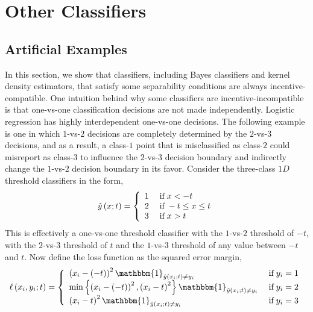 \documentclass{article}
\begin{document}
\section{Other Classifiers} 

\subsection{Artificial Examples}
In this section, we show that classifiers, including Bayes classifiers and kernel density estimators, that satisfy some separability conditions are always incentive-compatible. One intuition behind why some classifiers are incentive-incompatible is that one-vs-one classification decisions are not made independently. Logistic regression has highly interdependent one-vs-one decisions. The following example is one in which $1$-vs-$2$ decisions are completely determined by the $2$-vs-$3$ decisions, and as a result, a class-$1$ point that is misclassified as class-$2$ could misreport as class-$3$ to influence the $2$-vs-$3$ decision boundary and indirectly change the $1$-vs-$2$ decision boundary in its favor.
\newline \newline
Consider the three-class $1D$ threshold classifiers in the form,
\[ \hat{y}\left(x; t\right) =\left\{ \begin{array}{ll}
1& \text{\;if\;} x < -t \\
2& \text{\;if\;} -t \leq  x \leq  t \\
3& \text{\;if\;} x > t \\
\end{array}\right. \]
This is effectively a one-vs-one threshold classifier with the $1$-vs-$2$ threshold of $-t $, with the $2$-vs-$3$ threshold of $t $ and the $1$-vs-$3$ threshold of any value between $-t $ and $t $. Now define the loss function as the squared error margin,
\[ \ell\left(x_{i}, y_{i}; t\right) =\left\{ \begin{array}{ll}
\left(x_{i} - \left(-t\right)\right)^{2} \mathbbm{1}_{\hat{y}\left(x_{i}; t\right) \neq  y_{i}}& \text{\;if\;} y_{i} = 1 \\
\displaystyle\min\left\{\left(x_{i} - \left(-t\right)\right)^{2}, \left(x_{i} - t\right)^{2}\right\} \mathbbm{1}_{\hat{y}\left(x_{i}; t\right) \neq  y_{i}}& \text{\;if\;} y_{i} = 2 \\
\left(x_{i} - t\right)^{2} \mathbbm{1}_{\hat{y}\left(x_{i}; t\right) \neq  y_{i}}& \text{\;if\;} y_{i} = 3 \\
\end{array}\right. \]
\end{document}
